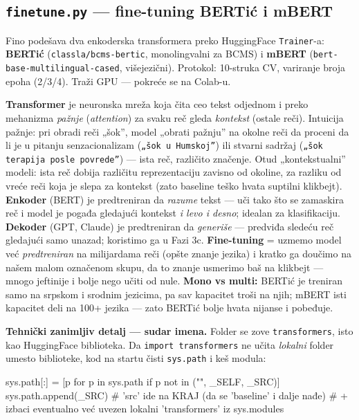 \documentclass[11pt,a4paper]{article}
\newcommand{\kod}[1]{\texttt{#1}}
\begin{document}
\subsection{\texttt{finetune.py} --- fine-tuning BERTić i mBERT}
Fino podešava dva enkoderska transformera preko HuggingFace \kod{Trainer}-a:
\textbf{BERTić} (\kod{classla/bcms-bertic}, monolingvalni za BCMS) i \textbf{mBERT}
(\kod{bert-base-multilingual-cased}, višejezični). Protokol: 10-struka CV, variranje
broja epoha (2/3/4). Traži GPU --- pokreće se na Colab-u.

\begin{teorija}
\textbf{Transformer} je neuronska mreža koja čita ceo tekst odjednom i preko mehanizma
\emph{pažnje} (\emph{attention}) za svaku reč gleda \emph{kontekst} (ostale reči).
Intuicija pažnje: pri obradi reči „šok'', model „obrati pažnju'' na okolne reči da
proceni da li je u pitanju senzacionalizam (\kod{„šok u Humskoj''}) ili stvarni
sadržaj (\kod{„šok terapija posle povrede''}) --- ista reč, različito značenje. Otud
„kontekstualni'' modeli: ista reč dobija različitu reprezentaciju zavisno od okoline,
za razliku od vreće reči koja je slepa za kontekst (zato baseline teško hvata suptilni
klikbejt). \textbf{Enkoder} (BERT) je predtreniran da \emph{razume} tekst --- uči tako
što se zamaskira reč i model je pogađa gledajući kontekst \emph{i levo i desno};
idealan za klasifikaciju. \textbf{Dekoder} (GPT, Claude) je predtreniran da
\emph{generiše} --- predviđa sledeću reč gledajući samo unazad; koristimo ga u Fazi 3c.
\textbf{Fine-tuning} = uzmemo model već \emph{predtreniran} na milijardama reči
(opšte znanje jezika) i kratko ga doučimo na našem malom označenom skupu, da to znanje
usmerimo baš na klikbejt --- mnogo jeftinije i bolje nego učiti od nule. \textbf{Mono
vs multi:} BERTić je treniran samo na srpskom i srodnim jezicima, pa sav kapacitet
troši na njih; mBERT isti kapacitet deli na 100+ jezika --- zato BERTić bolje hvata
nijanse i pobeđuje.
\end{teorija}

\textbf{Tehnički zanimljiv detalj --- sudar imena.} Folder se zove \kod{transformers},
isto kao HuggingFace biblioteka. Da \kod{import transformers} ne učita \emph{lokalni}
folder umesto biblioteke, kod na startu čisti \kod{sys.path} i keš modula:
\begin{code}
sys.path[:] = [p for p in sys.path if p not in ("", _SELF, _SRC)]
sys.path.append(_SRC)   # 'src' ide na KRAJ (da se 'baseline' i dalje nađe)
# + izbaci eventualno već uvezen lokalni 'transformers' iz sys.modules
\end{code}
\end{document}
